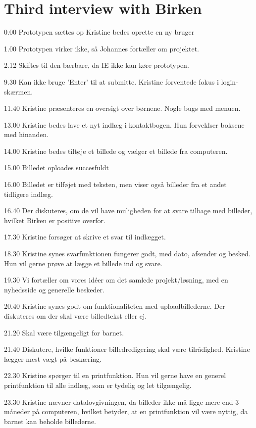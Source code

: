 \section*{Third interview with Birken}
\label{•}

0.00
Prototypen sættes op
Kristine bedes oprette en ny bruger

1.00
Prototypen virker ikke, så Johannes fortæller om projektet.

2.12
Skiftes til den bærbare, da IE ikke kan køre prototypen.

9.30
Kan ikke bruge 'Enter' til at submitte. Kristine forventede fokus i login-skærmen.

11.40
Kristine præsenteres en oversigt over børnene. 
Nogle bugs med menuen.

13.00
Kristine bedes lave et nyt indlæg i kontaktbogen. Hun forveklser boksene med hinanden.

14.00
Kristine bedes tiltøje et billede og vælger et billede fra computeren.

15.00
Billedet oploades succesfuldt 

16.00
Billedet er tilføjet med teksten, men viser også billeder fra et andet tidligere indlæg. 

16.40
Der diskuteres, om de vil have muligheden for at svare tilbage med billeder, hvilket Birken er positive overfor. 

17.30
Kristine forsøger at skrive et svar til indlægget.

18.30
Kristine synes svarfunktionen fungerer godt, med dato, afsender og besked.
Hun vil gerne prøve at lægge et billede ind og svare.

19.30
Vi fortæller om vores idéer om det samlede projekt/løsning, med en nyhedsside og generelle beskeder.

20.40
Kristine synes godt om funktionaliteten med uploadbillederne.
Der diskuteres om der skal være billedtekst eller ej.

21.20
Skal være tilgængeligt for barnet.

21.40
Diskutere, hvilke funktioner billedredigering skal være tilrådighed.
Kristine lægger mest vægt på beskæring.

22.30
Kristine spørger til en printfunktion. Hun vil gerne have en generel printfunktion til alle indlæg, som er tydelig og let tilgængelig.

23.30
Kristine nævner datalovgivningen, da billeder ikke må ligge mere end 3 måneder på computeren, hvilket betyder, at en printfunktion vil være nyttig, da barnet kan beholde billederne.

